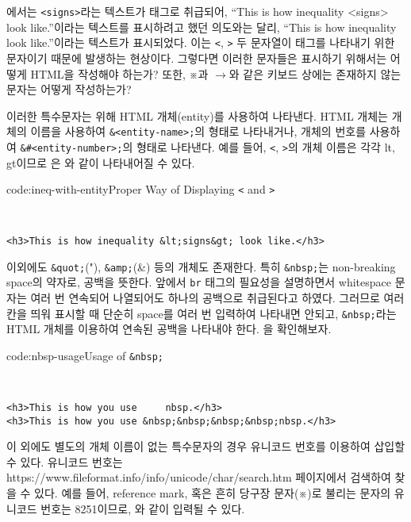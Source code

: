 에서는 \verb|<signs>|라는 텍스트가 태그로 취급되어, ``This is how inequality <signs> look like.''이라는 텍스트를 표시하려고 했던 의도와는 달리, ``This is how inequality look like.''이라는 텍스트가 표시되었다. 이는 \verb|<|, \verb|>| 두 문자열이 태그를 나타내기 위한 문자이기 때문에 발생하는 현상이다. 그렇다면 이러한 문자들은 표시하기 위해서는 어떻게 HTML을 작성해야 하는가? 또한, ※과 $\rightarrow$와 같은 키보드 상에는 존재하지 않는 문자는 어떻게 작성하는가?

이러한 특수문자는 위해 HTML 개체(entity)를 사용하여 나타낸다. HTML 개체는 개체의 이름을 사용하여 \verb|&<entity-name>;|의 형태로 나타내거나, 개체의 번호를 사용하여 \verb|&#<entity-number>;|의 형태로 나타낸다. 예를 들어, \verb|<|, \verb|>|의 개체 이름은 각각 lt, gt이므로 은 와 같이 나타내어질 수 있다.

\begin{codeenv}{code:ineq-with-entity}{Proper Way of Displaying \texttt{<} and \texttt{>}}\begin{verbatim}


<h3>This is how inequality &lt;signs&gt; look like.</h3>
\end{verbatim}
\end{codeenv}

이외에도 \verb|&quot;|("), \verb|&amp;|(\&) 등의 개체도 존재한다. 특히 \verb|&nbsp;|는 non-breaking space의 약자로, 공백을 뜻한다. 앞에서 \verb|br| 태그의 필요성을 설명하면서 whitespace 문자는 여러 번 연속되어 나열되어도 하나의 공백으로 취급된다고 하였다. 그러므로 여러 칸을 띄워 표시할 때 단순히 space를 여러 번 입력하여 나타내면 안되고, \verb|&nbsp;|라는 HTML 개체를 이용하여 연속된 공백을 나타내야 한다. 을 확인해보자.

\begin{codeenv}{code:nbsp-usage}{Usage of \texttt{\&nbsp;}}\begin{verbatim}


<h3>This is how you use     nbsp.</h3>
<h3>This is how you use &nbsp;&nbsp;&nbsp;&nbsp;nbsp.</h3>
\end{verbatim}
\end{codeenv}

이 외에도 별도의 개체 이름이 없는 특수문자의 경우 유니코드 번호를 이용하여 삽입할 수 있다. 유니코드 번호는 https://www.fileformat.info/info/unicode/char/search.htm 페이지에서 검색하여 찾을 수 있다. 예를 들어, reference mark, 혹은 흔히 당구장 문자(※)로 불리는 문자의 유니코드 번호는 8251이므로, 와 같이 입력될 수 있다.

